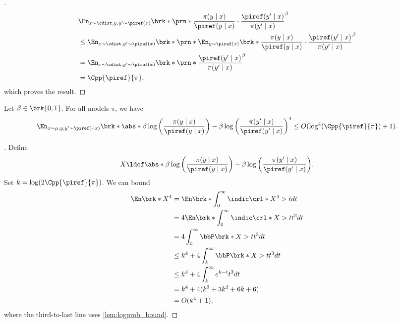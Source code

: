 \begin{proof}[]
\begin{align}
&\En_{x\sim\cdist,y,y'\sim\piref(x)}\brk*{\prn*{\frac{\pi(y\mid{}x)}{\piref(y\mid{}x)}\cdot\frac{\piref(y'\mid{}x)}{\pi(y'\mid{}x)}}^\beta
          }\\
  &\leq{}\En_{x\sim\cdist,y'\sim\piref(x)}\brk*{\prn*{\En_{y\sim\piref(x)}\brk*{\frac{\pi(y\mid{}x)}{\piref(y\mid{}x)}}\cdot\frac{\piref(y'\mid{}x)}{\pi(y'\mid{}x)}}^\beta}\\
&=\En_{x\sim\cdist,y'\sim\piref(x)}\brk*{\prn*{\frac{\piref(y'\mid{}x)}{\pi(y'\mid{}x)}}^\beta} \\
&= \Cpp{\piref}{\pi},
\end{align}
which proves the result.
\end{proof}

\begin{lemma}
  \label{lem:fourth_moment}
  Let $\beta\in\brk{0,1}$. For all models $\pi$, we have
  \begin{align}
    \En_{x\sim\mu,y,y'\sim\piref(\cdot\mid x)}\brk*{\abs*{\beta\log\left(\frac{\pi(y\mid{}x)}{\piref(y\mid{}x)}\right)-\beta\log\left(\frac{\pi(y'\mid{}x)}{\piref(y'\mid{}x)}\right)}^4}
    \leq{} O(\log^4(\Cpp{\piref}{\pi}) +
                         1).
  \end{align}
\end{lemma}
\begin{proof}[]
  Define 
\[X\ldef\abs*{\beta\log\left(\frac{\pi(y\mid{}x)}{\piref(y\mid{}x)}\right)-\beta\log\left(\frac{\pi(y'\mid{}x)}{\piref(y'\mid{}x)}\right)}.\]
Set $k = \log(2\Cpp{\piref}{\pi})$. 
We can bound
\begin{align}
\En\brk*{X^4}
&=
\En\brk*{\int_{0}^{\infty}\indic\crl*{X^4>t}dt}\\
&=
4\En\brk*{\int_{0}^{\infty}\indic\crl*{X>t}t^3dt}\\
&=
4\int_{0}^{\infty}\bbP\brk*{X>t}t^3dt\\
&\leq{} k^4 +
4\int_{k}^{\infty}\bbP\brk*{X>t}t^3dt\\
&\leq{} 
k^4 + 4\int_{k}^{\infty}e^{k-t}t^3dt\\
&=
k^4 +
4(k^3 + 3k^2 + 6k + 6) \\
&= O(k^4 + 1),
  \end{align}
  where the third-to-last line uses \cref{lem:logprob_bound}.
\end{proof}


